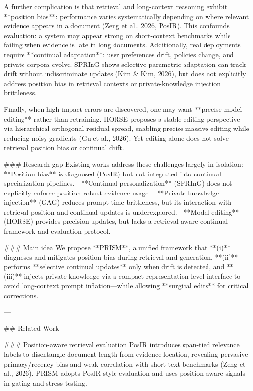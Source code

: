 A further complication is that retrieval and long-context reasoning exhibit **position bias**: performance varies systematically depending on where relevant evidence appears in a document (Zeng et al., 2026, PosIR). This confounds evaluation: a system may appear strong on short-context benchmarks while failing when evidence is late in long documents. Additionally, real deployments require **continual adaptation**: user preferences drift, policies change, and private corpora evolve. SPRInG shows selective parametric adaptation can track drift without indiscriminate updates (Kim & Kim, 2026), but does not explicitly address position bias in retrieval contexts or private-knowledge injection brittleness.

Finally, when high-impact errors are discovered, one may want **precise model editing** rather than retraining. HORSE proposes a stable editing perspective via hierarchical orthogonal residual spread, enabling precise massive editing while reducing noisy gradients (Gu et al., 2026). Yet editing alone does not solve retrieval position bias or continual drift.

### Research gap  
Existing works address these challenges largely in isolation:
- **Position bias** is diagnosed (PosIR) but not integrated into continual specialization pipelines.  
- **Continual personalization** (SPRInG) does not explicitly enforce position-robust evidence usage.  
- **Private knowledge injection** (GAG) reduces prompt-time brittleness, but its interaction with retrieval position and continual updates is underexplored.  
- **Model editing** (HORSE) provides precision updates, but lacks a retrieval-aware continual framework and evaluation protocol.

### Main idea  
We propose **PRISM**, a unified framework that **(i)** diagnoses and mitigates position bias during retrieval and generation, **(ii)** performs **selective continual updates** only when drift is detected, and **(iii)** injects private knowledge via a compact representation-level interface to avoid long-context prompt inflation—while allowing **surgical edits** for critical corrections.

---

## Related Work  

### Position-aware retrieval evaluation  
PosIR introduces span-tied relevance labels to disentangle document length from evidence location, revealing pervasive primacy/recency bias and weak correlation with short-text benchmarks (Zeng et al., 2026). PRISM adopts PosIR-style evaluation and uses position-aware signals in gating and stress testing.

